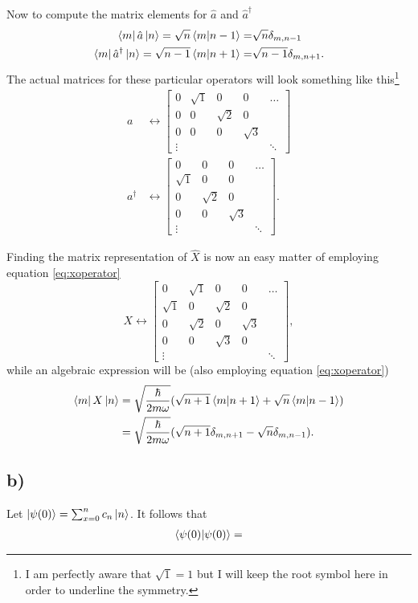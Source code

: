 \documentclass{article}
\begin{document}
Now to compute the matrix elements for $\hat{a}$ and $\hat{a}^{\dagger}$
\begin{align}
\bra{m}\hat{a}\ket{n}=\sqrt{n}\braket{m}{n-1}=&\sqrt{n}\delta_{m,n-1} \\
\bra{m}\hat{a}^{\dagger}\ket{n}=\sqrt{n-1}\braket{m}{n+1}=&\sqrt{n-1}\delta_{m,n+1}.
\end{align}
The actual matrices for these particular operators will look something like this\footnote{I am perfectly aware that $\sqrt{1}=1$ but I will keep the root symbol here in order to underline the symmetry.}
\begin{align}
a &\leftrightarrow \begin{bmatrix}
0 & \sqrt{1} & 0 & 0 & \dots \\
0 & 0 & \sqrt{2} & 0 &  \\
0 & 0 & 0 & \sqrt{3} & \\
\vdots & & & & \ddots 
\end{bmatrix} \\
a^{\dagger} &\leftrightarrow \begin{bmatrix}
0 & 0 & 0 & \dots \\
\sqrt{1} & 0 & 0 & \\
0 & \sqrt{2} & 0 & \\
0 & 0 & \sqrt{3} & \\
\vdots & & & \ddots 
\end{bmatrix}.
\end{align}

Finding the matrix representation of $\hat{X}$ is now an easy matter of employing equation \ref{eq:xoperator}
\begin{equation}
X \leftrightarrow  \begin{bmatrix}
0 & \sqrt{1} & 0 & 0 & \dots \\
\sqrt{1} & 0 & \sqrt{2} & 0 &  \\
0 & \sqrt{2} & 0 & \sqrt{3} & \\
0 & 0 & \sqrt{3} & 0 \\
\vdots & & & & \ddots 
\end{bmatrix},
\end{equation}
while an algebraic expression will  be (also employing equation \ref{eq:xoperator})
\begin{align}
\bra{m}X\ket{n} &= \sqrt{\frac{\hbar}{2m\omega}}(\sqrt{n+1}\braket{m}{n+1}+\sqrt{n}\braket{m}{n-1}) \\
&= \sqrt{\frac{\hbar}{2m\omega}}(\sqrt{n+1}\delta_{m,n+1}-\sqrt{n}\delta_{m,n-1}).
\end{align}

\subsection*{b)}
Let $\ket{\psi(0)}=\sum_{x=0}^n c_n\ket{n}$. It follows that
\begin{align*}
\braket{\psi(0)}=
\end{align*}
\end{document}
